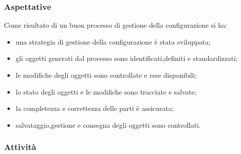 	\subsubsection{Aspettative}
	Come risultato di un buon processo di gestione della configurazione si ha:
	\begin{itemize}
	\item una strategia di gestione della configurazione è stata sviluppata;
	\item gli oggetti generati dal processo sono identificati,definiti e standardizzati;
	\item le modifiche degli oggetti sono controllate e rese disponibili;
	\item lo stato degli oggetti e le modifiche sono tracciate e salvate;
	\item la completezza e correttezza delle parti è assicurata;
	\item salvataggio,gestione e consegna degli oggetti sono controllati. 
	\end{itemize}
	\subsubsection{Attività}

